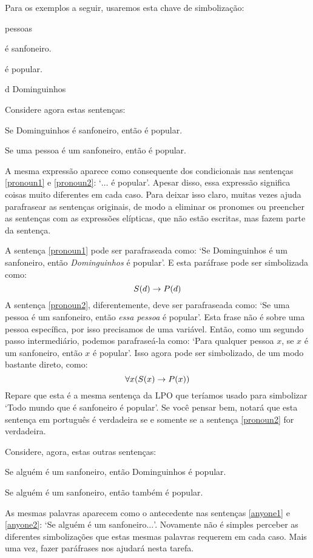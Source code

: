 Para os exemplos a seguir, usaremos esta chave de simbolização:
	\begin{center}
	\begin{ekey}
		\item[\text{domínio}] pessoas
		\item[\atom{S}{x}]  é sanfoneiro.
		\item[\atom{P}{x}]  é popular.
		\item[d] Dominguinhos
	\end{ekey}
	\end{center}
Considere agora estas sentenças:
	\begin{earg}
		\item[\ex{pronoun1}] Se Dominguinhos é sanfoneiro, então é popular.
		\item[\ex{pronoun2}] Se uma pessoa é um sanfoneiro, então é popular.
	\end{earg}
A mesma expressão aparece como consequente dos condicionais nas sentenças \ref{pronoun1} e \ref{pronoun2}: `$\ldots$ é popular'.
Apesar disso, essa expressão significa coisas muito diferentes em cada caso.
Para deixar isso claro, muitas vezes ajuda parafrasear as sentenças originais, de modo a eliminar os pronomes ou preencher as sentenças com as expressões elípticas, que não estão escritas, mas fazem parte da sentença.

A sentença \ref{pronoun1} pode ser parafraseada como: `Se Dominguinhos é um sanfoneiro, então \emph{Dominguinhos} é popular'. E esta paráfrase pode ser simbolizada como:
$$\mathord{S}(d) \rightarrow \mathord{P}(d)$$
A sentença \ref{pronoun2}, diferentemente, deve ser parafraseada como:
`Se uma pessoa é um sanfoneiro, então \emph{essa pessoa} é popular'.
Esta frase não é sobre uma pessoa específica, por isso precisamos de uma variável.
Então, como um segundo passo intermediário, podemos parafraseá-la como:
`Para qualquer pessoa $x$, se $x$ é um sanfoneiro, então $x$ é popular'.
Isso agora pode ser simbolizado, de um modo bastante direto, como:
$$\forall x (\mathord{S}(x) \rightarrow \mathord{P}(x))$$
Repare que esta é a mesma sentença da LPO que teríamos usado para simbolizar `Todo mundo que é sanfoneiro é popular'.
Se você pensar bem, notará que esta sentença em português é verdadeira se e somente se a sentença \ref{pronoun2} for verdadeira.

Considere, agora, estas outras sentenças:
	\begin{earg}
		\item[\ex{anyone1}] Se alguém é um sanfoneiro, então Dominguinhos é popular.
		\item[\ex{anyone2}] Se alguém é um sanfoneiro, então também é popular.
	\end{earg}
As mesmas palavras aparecem como o antecedente nas sentenças \ref{anyone1} e \ref{anyone2}: `Se alguém é um sanfoneiro$\ldots$'.
Novamente não é simples perceber as diferentes simbolizações que estas mesmas palavras requerem em cada caso.
Mais uma vez, fazer paráfrases nos ajudará nesta tarefa. 

